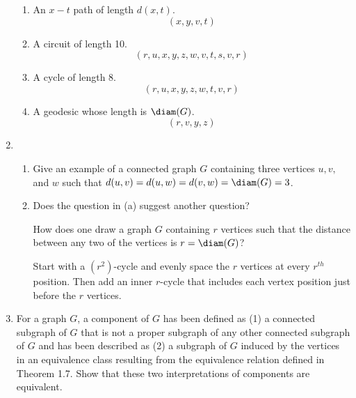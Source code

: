 \documentclass[letterpaper,12pt,fleqn]{article}
\begin{document}
\begin{enumerate}[start=11]
\begin{enumerate}
  \item An \(x-t\) path of length \(d(x,t)\).
    \[(x,y,v,t)\]

  \item A circuit of length 10.
    \[(r,u,x,y,z,w,v,t,s,v,r)\]

  \item A cycle of length 8.
    \[(r,u,x,y,z,w,t,v,r)\]

  \item A geodesic whose length is \(\diam(G)\).
    \[(r,v,y,z)\]
  \end{enumerate}

  \bigskip

\item
  \begin{enumerate}
  \item Give an example of a connected graph \(G\) containing three vertices \(u, v,\) and \(w\) such that
    \(d(u,v)=d(u,w)=d(v,w)=\diam(G)=3\).

    \bigskip

    \begin{center}
    \end{center}

  \item Does the question in (a) suggest another question?

    How does one draw a graph \(G\) containing \(r\) vertices such that the distance between any two of the
    vertices is \(r=\diam(G)\)?

    Start with a \((r^2)\)-cycle and evenly space the \(r\) vertices at every \(r^{th}\) position.  Then add an inner
    \(r\)-cycle that includes each vertex position just before the \(r\) vertices.

  \end{enumerate}

  \bigskip

\item For a graph \(G\), a component of \(G\) has been defined as (1) a connected subgraph of \(G\) that is not a
  proper subgraph of any other connected subgraph of \(G\) and has been described as (2) a subgraph of \(G\)
  induced by the vertices in an equivalence class resulting from the equivalence relation defined in Theorem 1.7.
  Show that these two interpretations of components are equivalent.


\end{enumerate}
\end{document}
